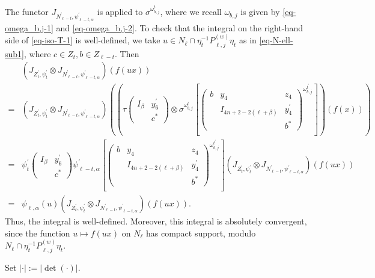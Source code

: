\documentclass[12pt]{amsart}
\theoremstyle{remark}
\begin{document}
The functor $J_{N_{\ell-t}^\prime, \psi_{\ell-t,\alpha} ^\prime}$ is applied to $\sigma^{\omega_{b,j}^t}$, where we recall $\omega_{b,j}$ is given by \eqref{eq-omega_b,j-1} and \eqref{eq-omega_b,j-2}.
To check that the integral on the right-hand side of \eqref{eq-iso-T-1} is well-defined, we take $u\in N_{\ell}\cap \eta_t^{-1} P_{\ell,j}^{(w)}\eta_t$ as in \eqref{eq-N-ell-sub1}, where $c\in Z_t, b\in Z_{\ell-t}$. Then 
\begin{equation*}
\begin{split}
&	\left( J_{Z_t^\prime,\psi_t^\prime}\otimes J_{N_{\ell-t}^\prime, \psi_{\ell-t,\alpha} ^\prime} \right) (f(ux))   \\
=&  \left( J_{Z_t^\prime,\psi_t^\prime}\otimes J_{N_{\ell-t}^\prime, \psi_{\ell-t,\alpha} ^\prime} \right) \left( \left(\tau\begin{pmatrix}I_\beta & y_6^\prime \\ & c^*\end{pmatrix}\otimes \sigma^{\omega_{b,j}^t}\left[\begin{pmatrix} b &y_4&z_4\\ &I_{4n+2-2(\ell+\beta)} & y_4^\prime\\ &&b^*\end{pmatrix}^{\omega_{b,j}^{t^\prime}} \right] \right)(f(x))  \right)\\
=& \psi_t^\prime \begin{pmatrix}I_\beta & y_6^\prime \\ & c^*\end{pmatrix}  \psi_{\ell-t,\alpha} ^\prime \left[\begin{pmatrix} b &y_4&z_4\\ &I_{4n+2-2(\ell+\beta)} & y_4^\prime\\ &&b^*\end{pmatrix}^{\omega_{b,j}^{t^\prime}} \right] \left( J_{Z_t^\prime,\psi_t^\prime}\otimes J_{N_{\ell-t}^\prime, \psi_{\ell-t,\alpha} ^\prime} \right) (f(ux)) \\
=& \psi_{\ell,\alpha}(u) \left( J_{Z_t^\prime,\psi_t^\prime}\otimes J_{N_{\ell-t}^\prime, \psi_{\ell-t,\alpha} ^\prime} \right) (f(ux)).
\end{split}
\end{equation*}
Thus, the integral is well-defined. Moreover, this integral is absolutely convergent, since the function $u\mapsto f(ux)$ on $N_{\ell}$ has compact support, modulo $N_{\ell}\cap \eta_t^{-1} P_{\ell,j}^{(w)}\eta_t$.

Set $|\cdot|:=|\det(\cdot)|$.
\end{document}
